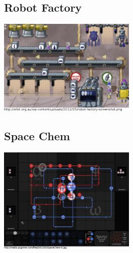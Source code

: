 \documentclass[a4paper]{scrartcl}
\begin{document}
    \begin{multicols}{2}
        \subsection{Robot Factory}
            \includegraphics[width=0.49\textwidth]{similar_games/RobotFactory}

        \subsection{Space Chem}
            \includegraphics[width=0.49\textwidth]{similar_games/SpaceChem}
    \end{multicols}
\end{document}
